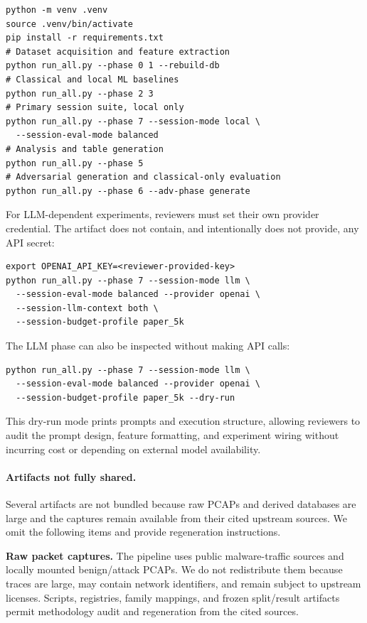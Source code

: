 \documentclass[letterpaper,twocolumn,10pt]{article}
\begin{document}
\begin{lstlisting}[style=shellstyle_bw]
python -m venv .venv
source .venv/bin/activate
pip install -r requirements.txt
# Dataset acquisition and feature extraction
python run_all.py --phase 0 1 --rebuild-db
# Classical and local ML baselines
python run_all.py --phase 2 3
# Primary session suite, local only
python run_all.py --phase 7 --session-mode local \
  --session-eval-mode balanced
# Analysis and table generation
python run_all.py --phase 5
# Adversarial generation and classical-only evaluation
python run_all.py --phase 6 --adv-phase generate
\end{lstlisting}

For LLM-dependent experiments, reviewers must set their own provider credential. The artifact does not contain, and intentionally does not provide, any API secret:

\begin{lstlisting}[style=shellstyle_bw]
export OPENAI_API_KEY=<reviewer-provided-key>
python run_all.py --phase 7 --session-mode llm \
  --session-eval-mode balanced --provider openai \
  --session-llm-context both \
  --session-budget-profile paper_5k
\end{lstlisting}

The LLM phase can also be inspected without making API calls:

\begin{lstlisting}[style=shellstyle_bw]
python run_all.py --phase 7 --session-mode llm \
  --session-eval-mode balanced --provider openai \
  --session-budget-profile paper_5k --dry-run
\end{lstlisting}

This dry-run mode prints prompts and execution structure, allowing reviewers to audit the prompt design, feature formatting, and experiment wiring without incurring cost or depending on external model availability.

\paragraph{Artifacts not fully shared.}
Several artifacts are not bundled because raw PCAPs and derived databases are large and the captures remain available from their cited upstream sources. We omit the following items and provide regeneration instructions.

\textbf{Raw packet captures.}
The pipeline uses public malware-traffic sources and locally mounted benign/attack PCAPs. We do not redistribute them because traces are large, may contain network identifiers, and remain subject to upstream licenses. Scripts, registries, family mappings, and frozen split/result artifacts permit methodology audit and regeneration from the cited sources.
\end{document}
